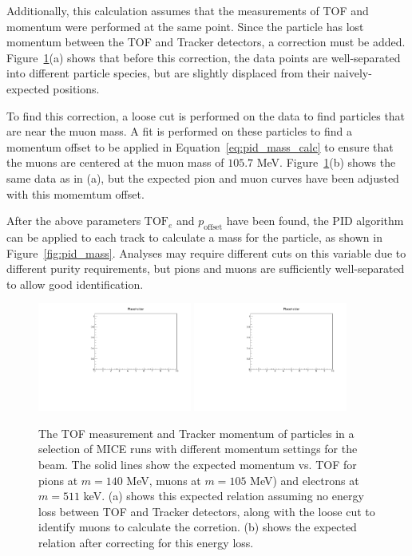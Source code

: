 Additionally, this calculation assumes that the measurements of TOF and momentum were performed at the same point.  Since the particle has lost momentum between the TOF and Tracker detectors, a correction must be added.  Figure~\ref{fig:tof_track}(a) shows that before this correction, the data points are well-separated into different particle species, but are slightly displaced from their naively-expected positions.

To find this correction, a loose cut is performed on the data to find particles that are near the muon mass.  A fit is performed on these particles to find a momentum offset to be applied in Equation~\ref{eq:pid_mass_calc} to ensure that the muons are centered at the muon mass of $105.7$ MeV.  Figure~\ref{fig:tof_track}(b) shows the same data as in (a), but the expected pion and muon curves have been adjusted with this momemtum offset.

After the above parameters $\mathrm{TOF}_e$ and $p_\mathrm{offset}$ have been found, the PID algorithm can be applied to each track to calculate a mass for the particle, as shown in Figure~\ref{fig:pid_mass}.  Analyses may require different cuts on this variable due to different purity requirements, but pions and muons are sufficiently well-separated to allow good identification.

\begin{figure}
\includegraphics[width=0.45\textwidth]{07-PID/plots/placeholder.pdf}\hfil
\includegraphics[width=0.45\textwidth]{07-PID/plots/placeholder.pdf}
\caption{The TOF measurement and Tracker momentum of particles in a selection of MICE runs with different momentum settings for the beam.  The solid lines show the expected momentum vs. TOF for pions at $m=140$ MeV, muons at $m=105$ MeV) and electrons at $m=511$ keV.  (a) shows this expected relation assuming no energy loss between TOF and Tracker detectors, along with the loose cut to identify muons to calculate the corretion.  (b) shows the expected relation after correcting for this energy loss.}
\label{fig:tof_track}
\end{figure}

